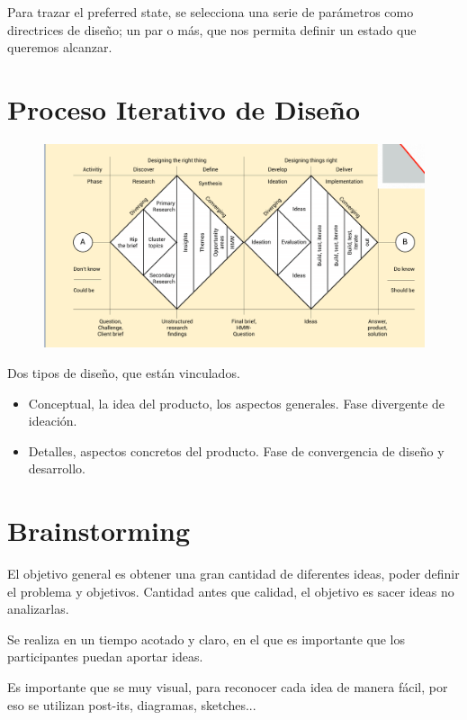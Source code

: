 \documentclass[12pt]{report} %
\begin{document}
Para trazar el preferred state, se selecciona una serie de parámetros como directrices de diseño; un par o más, que nos permita definir un estado que queremos alcanzar.

\section{Proceso Iterativo de Diseño}

\begin{figure}[H]
	{\includegraphics[scale=.4]{2021-03-20 21_09_36-L5.pdf - Foxit Reader.png}}
\end{figure}

Dos tipos de diseño, que están vinculados.
\begin{itemize}
  \item Conceptual, la idea del producto, los aspectos generales. Fase divergente de ideación.
  \item Detalles, aspectos concretos del producto. Fase de convergencia de diseño y desarrollo.
\end{itemize}

\section{Brainstorming}
El objetivo general es obtener una gran cantidad de diferentes ideas, poder definir el problema y objetivos. Cantidad antes que calidad, el objetivo es sacer ideas no analizarlas.

Se realiza en un tiempo acotado y claro, en el que es importante que los participantes puedan aportar ideas.

Es importante que se muy visual, para reconocer cada idea de manera fácil, por eso se utilizan post-its, diagramas, sketches...
\end{document}
